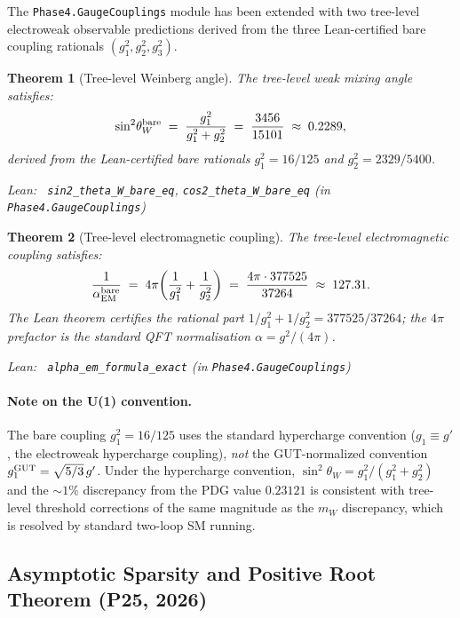 \documentclass[11pt,a4paper]{article}
\newenvironment{leanref}%
  {\par\smallskip\noindent\begingroup\raggedright\textup{Lean:}~}%
  {\par\endgroup}
\newtheorem{theorem}{Theorem}[section]
\theoremstyle{definition}
\begin{document}
The \texttt{Phase4.GaugeCouplings} module has been extended with two tree-level
electroweak observable predictions derived from the three Lean-certified bare
coupling rationals $(g_1^2, g_2^2, g_3^2)$.

\begin{theorem}[Tree-level Weinberg angle]\label{thm:sin2-thetaW}
The tree-level weak mixing angle satisfies:
\[
  \sin^2\!\theta_W^{\rm bare}
  \;=\; \frac{g_1^2}{g_1^2 + g_2^2}
  \;=\; \frac{3456}{15101} \;\approx\; 0.2289,
\]
derived from the Lean-certified bare rationals $g_1^2 = 16/125$ and $g_2^2 = 2329/5400$.

\begin{leanref} \lstinline|sin2_theta_W_bare_eq|,
\lstinline|cos2_theta_W_bare_eq|
\textup{(in \texttt{Phase4.GaugeCouplings})}
\end{leanref}
\end{theorem}

\begin{theorem}[Tree-level electromagnetic coupling]\label{thm:alpha-em}
The tree-level electromagnetic coupling satisfies:
\[
  \frac{1}{\alpha_{\rm EM}^{\rm bare}}
  \;=\; 4\pi\!\left(\frac{1}{g_1^2} + \frac{1}{g_2^2}\right)
  \;=\; \frac{4\pi \cdot 377525}{37264} \;\approx\; 127.31.
\]
The Lean theorem certifies the rational part $1/g_1^2 + 1/g_2^2 = 377525/37264$;
the $4\pi$ prefactor is the standard QFT normalisation $\alpha = g^2/(4\pi)$.

\begin{leanref} \lstinline|alpha_em_formula_exact|
\textup{(in \texttt{Phase4.GaugeCouplings})}
\end{leanref}
\end{theorem}

\paragraph{Note on the U(1) convention.}
The bare coupling $g_1^2 = 16/125$ uses the standard hypercharge convention
($g_1 \equiv g'$, the electroweak hypercharge coupling), \emph{not} the
GUT-normalized convention $g_1^{\rm GUT} = \sqrt{5/3}\,g'$.
Under the hypercharge convention, $\sin^2\!\theta_W = g_1^2/(g_1^2 + g_2^2)$
and the $\sim 1\%$ discrepancy from the PDG value $0.23121$ is consistent
with tree-level threshold corrections of the same magnitude as the $m_W$
discrepancy, which is resolved by standard two-loop SM running.

\subsection{Asymptotic Sparsity and Positive Root Theorem (P25, 2026)}
\label{subsec:p25}
\end{document}
